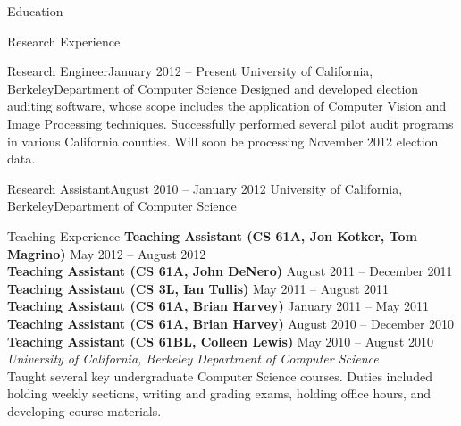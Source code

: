\documentclass{resume}
\begin{document}
\vspace{1.0em}

\begin{component}{Education}
\end{component}

\vspace{0.5em}

\begin{component}{Research Experience}
    \begin{position}{Research Engineer}{January 2012 -- Present}
        {University of California, Berkeley}{Department of Computer Science}
    {Designed and developed election auditing software, whose scope includes the application of Computer Vision and Image Processing techniques. Successfully performed several pilot audit programs in various California counties. Will soon be processing November 2012 election data.}
    \end{position}
    
    \begin{position}{Research Assistant}{August 2010 -- January 2012}
        {University of California, Berkeley}{Department of Computer Science}
    {}
    \end{position}
\end{component}

\begin{component}{Teaching Experience}
    \textbf{Teaching Assistant (CS 61A, Jon Kotker, Tom Magrino)} \hfill May 2012 -- August 2012 \\
    \textbf{Teaching Assistant (CS 61A, John DeNero)} \hfill August 2011 -- December 2011 \\
    \textbf{Teaching Assistant (CS 3L, Ian Tullis)} \hfill May 2011 -- August 2011 \\
    \textbf{Teaching Assistant (CS 61A, Brian Harvey)} \hfill January 2011 -- May 2011 \\
    \textbf{Teaching Assistant (CS 61A, Brian Harvey)} \hfill August 2010 -- December 2010 \\
    \textbf{Teaching Assistant (CS 61BL, Colleen Lewis)} \hfill May 2010 -- August 2010 \\
        \textit{University of California, Berkeley \hfill Department of Computer Science}\\
    Taught several key undergraduate Computer Science courses. Duties included holding weekly sections, writing and grading exams, holding office hours, and developing course materials.
\end{component}
\end{document}

